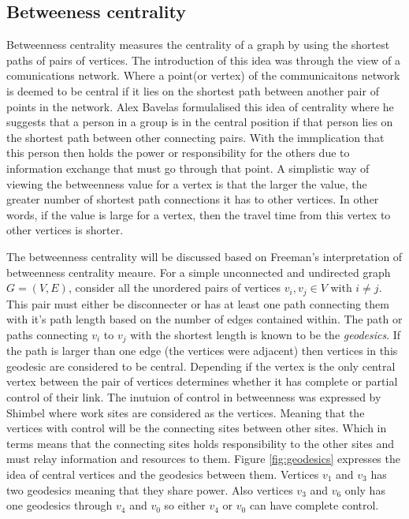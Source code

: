\subsection{Betweeness centrality}
Betweenness centrality measures the centrality of a graph by using the shortest paths of pairs of vertices. The introduction of this idea was through the view of a comunications network. Where a point(or vertex) of the communicaitons network is deemed to be central if it lies on the shortest path between another pair of points in the network. Alex Bavelas\cite{bavelas1948mathematical} formulalised this idea of centrality where he suggests that a person in a group is in the central position if that person lies on the shortest path between other connecting pairs. With the immplication that this person then holds the power or responsibility for the others due to information exchange that must go through that point. A simplistic way of viewing the betweenness value for a vertex is that the larger the value, the greater number of shortest path connections it has to other vertices. In other words, if the value is large for a vertex, then the travel time from this vertex to other vertices is shorter. 

The betweenness centrality will be discussed based on Freeman's interpretation of betweenness centrality meaure\cite{freeman1977set}. For a simple unconnected and undirected graph $G = (V, E)$, consider all the unordered pairs of vertices $v_i, v_j \in V$ with $i \ne j$. This pair must either be disconnecter or has at least one path connecting them with it's path length based on the number of edges contained within. The path or paths connecting $v_i$ to $v_j$ with the shortest length is known to be the \emph{geodesics}. If the path is larger than one edge (the vertices were adjacent) then vertices in this geodesic are considered to be central. Depending if the vertex is the only central vertex between the pair of vertices determines whether it has complete or partial control of their link. The inutuion of control in betweenness was expressed by Shimbel\cite{shimbel1953structural} where work sites are considered as the vertices. Meaning that the vertices with control will be the connecting sites between other sites. Which in terms means that the connecting sites holds responsibility to the other sites and must relay information and resources to them. Figure \ref{fig:geodesics} expresses the idea of central vertices and the geodesics between them. Vertices $v_1$ and $v_3$ has two geodesics meaning that they share power. Also vertices $v_3$ and $v_6$ only has one geodesics through $v_4$ and $v_0$ so either $v_4$ or $v_0$ can have complete control.

